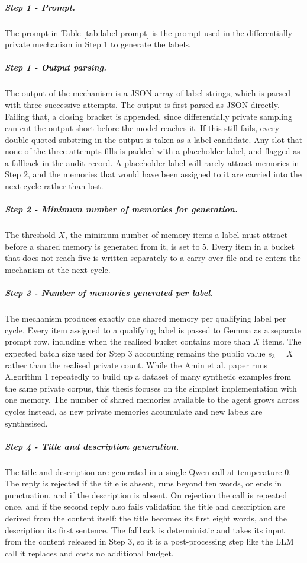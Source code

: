 \subparagraph{Step 1 - Prompt.}
The prompt in Table \ref{tab:label-prompt} is the prompt used in the differentially private mechanism in Step 1 to generate the labels.

\subparagraph{Step 1 - Output parsing.} The output of the mechanism is a JSON array of label strings, which is parsed with three successive attempts. The output is first parsed as JSON directly. Failing that, a closing bracket is appended, since differentially private sampling can cut the output short before the model reaches it. If this still fails, every double-quoted substring in the output is taken as a label candidate. Any slot that none of the three attempts fills is padded with a placeholder label, and flagged as a fallback in the audit record. A placeholder label will rarely attract memories in Step 2, and the memories that would have been assigned to it are carried into the next cycle rather than lost.

\subparagraph{Step 2 - Minimum number of memories for generation.}
The threshold $X$, the minimum number of memory items a label must attract before a shared memory is generated from it, is set to 5. Every item in a bucket that does not reach five is written separately to a carry-over file and re-enters the mechanism at the next cycle.

\subparagraph{Step 3 - Number of memories generated per label.}
The mechanism produces exactly one shared memory per qualifying label per cycle. Every item assigned to a qualifying label is passed to Gemma as a separate prompt row, including when the realised bucket contains more than $X$ items. The expected batch size used for Step 3 accounting remains the public value $s_3=X$ rather than the realised private count. While the Amin et al. paper runs Algorithm 1 repeatedly to build up a dataset of many synthetic examples from the same private corpus, this thesis focuses on the simplest implementation with one memory. The number of shared memories available to the agent grows across cycles instead, as new private memories accumulate and new labels are synthesised.

\subparagraph{Step 4 - Title and description generation.}
The title and description are generated in a single Qwen call at temperature 0. The reply is rejected if the title is absent, runs beyond ten words, or ends in punctuation, and if the description is absent. On rejection the call is repeated once, and if the second reply also fails validation the title and description are derived from the content itself: the title becomes its first eight words, and the description its first sentence. The fallback is deterministic and takes its input from the content released in Step 3, so it is a post-processing step like the LLM call it replaces and costs no additional budget.

